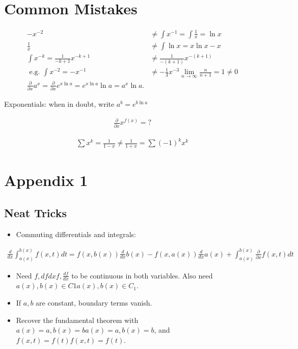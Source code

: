 \hypertarget{common-mistakes}{%
\section{Common Mistakes}\label{common-mistakes}}

\begin{align*}
-x^{-2} &\neq \int x^{-1} = \int \frac{1}{x} = \ln x \\ 
\frac{1}{x} &\neq \int \ln x = x\ln x - x \\
\int x^{-k} = \frac{1}{-k+1}x^{-k+1} &\neq \frac{1}{-(k+1)}x^{-(k+1)} \\
\text{ e.g. } \int x^{-2} = -x^{-1} &\neq -\frac{1}{3}x^{-3}
\lim_{n\to\infty} \frac{n}{n+1} = 1 \neq 0\\
\frac{\partial}{\partial x}a^x = \frac{\partial}{\partial x}e^{x\ln a} = e^{x\ln a} \ln a = a^x \ln a.
\end{align*}

Exponentials: when in doubt, write \(a^b = e^{b\ln a}\)

\begin{align*}
\frac{\partial}{\partial x} x^{f(x)} = ?
\end{align*}

\begin{align*}
\sum x^k = \frac{1}{1-x} \neq \frac{1}{1+x} = \sum (-1)^k x^k
\end{align*}

\hypertarget{appendix-1}{%
\section{Appendix 1}\label{appendix-1}}

\hypertarget{neat-tricks}{%
\subsection{Neat Tricks}\label{neat-tricks}}

\begin{itemize}
\tightlist
\item
  Commuting differentials and integrals:
\end{itemize}

\begin{align*}
\frac{d}{dx} \int_{a(x)}^{b(x)} f(x,t) dt = f(x, b(x))\frac{d}{dx}b(x) - f(x, a(x))\frac{d}{dx}a(x) + \int_{a(x)}^{b(x)} \frac{\partial}{\partial x} f(x, t) dt
\end{align*}

\begin{itemize}
\tightlist
\item
  Need \(f,dfdxf, \frac{df}{dx}\) to be continuous in both variables.
  Also need \(a(x),b(x)∈C1a(x),b(x) \in C_1\).
\item
  If \(a,b\) are constant, boundary terms vanish.
\item
  Recover the fundamental theorem with
  \(a(x)=a,b(x)=ba(x) = a, b(x) = b\), and \(f(x,t)=f(t)f(x,t) = f(t)\).
\end{itemize}


